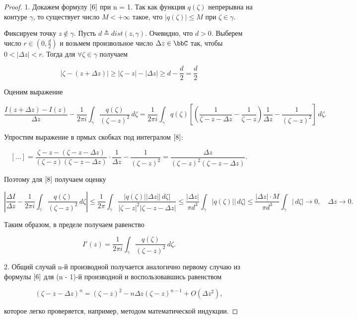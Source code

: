 \begin{proof}
1. Докажем формулу $\eqref{6}$ при n = 1. Так как функция $q(\zeta)$ непрерывна на контуре $\gamma$, то существует число $M < + \infty$ такое, что $|q(\zeta)| \le M$ при $\zeta \in \gamma$.

Фиксируем точку $z \notin \gamma$. Пусть $d \triangleq dist(z, \gamma)$. Очевидно, что $d > 0$. Выберем число $r \in (0, \frac{d}{2})$ и возьмем произвольное число $\Delta z \in \bbC$ так, чтобы $0 < |\Delta z| < r$. Тогда для $\forall \zeta \in \gamma$ получаем

\begin{equation} \label{7}
|\zeta - (z + \Delta z)| \ge |\zeta - z| - |\Delta z| \ge d - \frac{d}{2} = \frac{d}{2}
\end{equation}

Оценим выражение

\begin{equation} \label{8}
\frac{I(z + \Delta z) - I(z)}{\Delta z} - \frac{1}{2 \pi i} \int_\gamma \frac{q(\zeta)}{(\zeta - z)^2}\,d\zeta = \frac{1}{2 \pi i} \int_\gamma q(\zeta) \left[ \left( \frac{1}{\zeta - z - \Delta z} - \frac{1}{\zeta - z} \right) \frac{1}{\Delta z} - \frac{1}{(\zeta - z)^2} \right] \,d\zeta.
\end{equation}

Упростим выражение в прмых скобках под интегралом $\eqref{8}$:

$$
[\ldots] = \frac{\zeta - z - (\zeta - z - \Delta z)}{(\zeta - z)(\zeta - z - \Delta z)} \cdot \frac{1}{\Delta z} - \frac{1}{(\zeta - z)^2} = \frac{\Delta z}{(\zeta - z)^2 (\zeta - z - \Delta z)} .
$$

Поэтому для $\eqref{8}$ получаем оценку 

$$
\left| \frac{\Delta I}{\Delta z} - \frac{1}{2\pi i} \int_\gamma \frac{q(\zeta)}{(\zeta - z)^2}\,d\zeta \right| 
\le \frac{1}{2\pi} \int_\gamma \frac{|q(\zeta)||\Delta z||\,d\zeta|}{|\zeta - z|^2|\zeta - z - \Delta z|}
\le \frac{|\Delta z|}{\pi d^3} \int_\gamma |q(\zeta)||\,d\zeta| 
\le \frac{|\Delta z| \cdot M}{\pi d^3} \int_\gamma |\,d\zeta| \to 0, \quad \Delta z \to 0.
$$

Таким образом, в пределе получаем равенство

\begin{equation} \label{9}
I'(z) = \frac{1}{2\pi i} \int_\gamma \frac{q(\zeta)}{(\zeta - z)^2} \,d\zeta.
\end{equation}

2. Общий случай n-й производной получается аналогично первому случаю из формулы $\eqref{6}$ для (n - 1)-й производной и воспользовавшись равенством

$$
(\zeta - z - \Delta z)^n = (\zeta - z)^2 - n \Delta z (\zeta - z)^{n - 1} + O(\Delta z^2),
$$

которое легко проверяется, например, методом математической индукции.

\end{proof}

